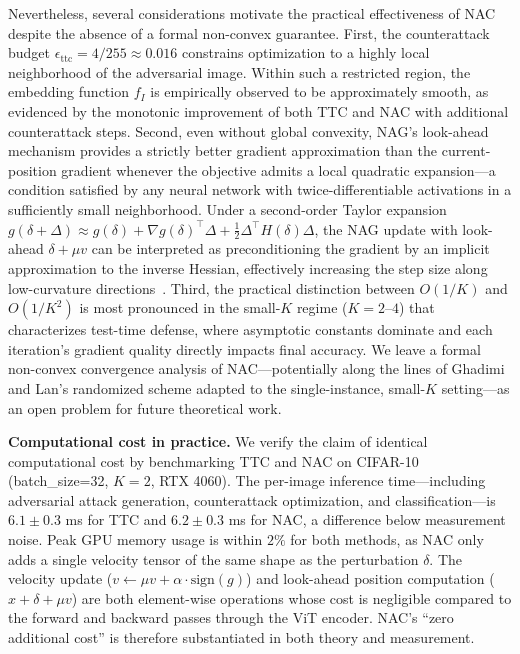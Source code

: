 \documentclass[12pt,a4paper]{article}
\begin{document}
Nevertheless, several considerations motivate the practical effectiveness of NAC despite the absence of a formal non-convex guarantee. First, the counterattack budget $\epsilon_{\text{ttc}} = 4/255 \approx 0.016$ constrains optimization to a highly local neighborhood of the adversarial image. Within such a restricted region, the embedding function $f_I$ is empirically observed to be approximately smooth, as evidenced by the monotonic improvement of both TTC and NAC with additional counterattack steps. Second, even without global convexity, NAG's look-ahead mechanism provides a strictly better gradient approximation than the current-position gradient whenever the objective admits a local quadratic expansion---a condition satisfied by any neural network with twice-differentiable activations in a sufficiently small neighborhood. Under a second-order Taylor expansion $g(\delta + \Delta) \approx g(\delta) + \nabla g(\delta)^\top \Delta + \frac{1}{2} \Delta^\top H(\delta) \Delta$, the NAG update with look-ahead $\delta + \mu v$ can be interpreted as preconditioning the gradient by an implicit approximation to the inverse Hessian, effectively increasing the step size along low-curvature directions~\cite{nesterov1983method}. Third, the practical distinction between $O(1/K)$ and $O(1/K^2)$ is most pronounced in the small-$K$ regime ($K=2$--$4$) that characterizes test-time defense, where asymptotic constants dominate and each iteration's gradient quality directly impacts final accuracy. We leave a formal non-convex convergence analysis of NAC---potentially along the lines of Ghadimi and Lan's randomized scheme adapted to the single-instance, small-$K$ setting---as an open problem for future theoretical work.

\textbf{Computational cost in practice.} We verify the claim of identical computational cost by benchmarking TTC and NAC on CIFAR-10 (batch\_size=32, $K=2$, RTX 4060). The per-image inference time---including adversarial attack generation, counterattack optimization, and classification---is $6.1 \pm 0.3$ ms for TTC and $6.2 \pm 0.3$ ms for NAC, a difference below measurement noise. Peak GPU memory usage is within $2\%$ for both methods, as NAC only adds a single velocity tensor of the same shape as the perturbation $\delta$. The velocity update ($v \leftarrow \mu v + \alpha \cdot \text{sign}(g)$) and look-ahead position computation ($x + \delta + \mu v$) are both element-wise operations whose cost is negligible compared to the forward and backward passes through the ViT encoder. NAC's ``zero additional cost'' is therefore substantiated in both theory and measurement.
\end{document}
